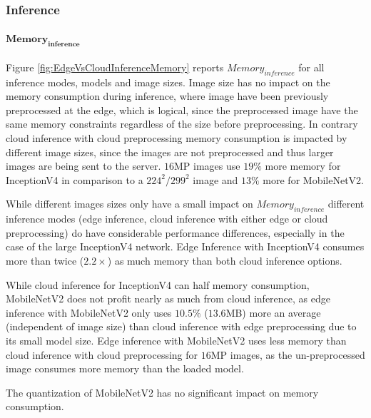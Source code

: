 \FloatBarrier
\subsubsection{Inference}
\paragraph{$\mathbf{Memory_{inference}}$}
Figure \ref{fig:EdgeVsCloudInferenceMemory} reports $Memory_{inference}$ for all inference modes, models and image sizes.
Image size has no impact on the memory consumption during inference, where image have been previously preprocessed at the edge, which is logical, since the preprocessed image have the same memory constraints regardless of the size before preprocessing.
In contrary cloud inference with cloud preprocessing memory consumption is impacted by different image sizes, since the images are not preprocessed and thus larger images are being sent to the server.
$16$MP images use $19\%$ more memory for InceptionV4 in comparison to a $224^2/299^2$ image and $13\%$ more for MobileNetV2.


While different images sizes only have a small impact on $Memory_{inference}$ different inference modes (edge inference, cloud inference with either edge or cloud preprocessing) do have considerable performance differences, especially in the case of the large InceptionV4 network.
Edge Inference with InceptionV4 consumes more than twice ($2.2\times$) as much memory than both cloud inference options.

While cloud inference for InceptionV4 can half memory consumption, MobileNetV2 does not profit nearly as much from cloud inference, as edge inference with MobileNetV2 only uses $10.5\%$ ($13.6$MB) more an average (independent of image size) than cloud inference with edge preprocessing due to its small model size.
Edge inference with MobileNetV2 uses less memory than cloud inference with cloud preprocessing for $16$MP images, as the un-preprocessed image consumes more memory than the loaded model. 

The quantization of MobileNetV2 has no significant impact on memory consumption.



